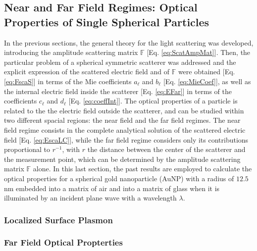 \documentclass[11pt]{Latex/Classes/PhDthesisPSnPDF}
\begin{document}
        \subsection{Near and Far Field Regimes: Optical Properties of Single Spherical Particles}
		 \label{ss:AuMie}

         In the previous sections, the general theory for the light scattering was developed, introducing the amplitude scattering matrix $\mathbb{F}$ [Eq. \eqref{eq:ScatAmpMat}]. Then, the particular problem of a spherical symmetric scatterer was addressed and the explicit expression of the scattered electric field and of $\mathbb{F}$ were obtained [Eq. \eqref{eq:FscaS}] in terms of the Mie coefficients $a_\ell$ and  $b_\ell$ [Eq. \eqref{eq:MieCoef}], as well as the internal electric field inside the scatterer [Eq. \eqref{eq:EFar}] in terms of the coefficients $c_\ell$ and $d_\ell$ [Eq. \eqref{eq:coeffInt}]. The  optical properties of a particle is related to the the electric field outside the scatterer,  and can be studied within two different spacial regions: the near field and the far field regimes. The near field regime consists in the complete analytical solution of the scattered electric field [Eq. \eqref{eq:EscaLC}], while the far field regime considers only its contributions proportional to $r^{-1}$, with $r$ the distance between the center of the scatterer and the measurement point, which can be determined by the amplitude scattering matrix $\mathbb{F}$ alone.  In this last section,
                the past results are employed to calculate the optical properties for a spherical gold nanoparticle (AuNP) with a radius of $12.5$ nm embedded into a matrix of air and into a matrix of glass when it is illuminated by an incident plane wave with a wavelength $\lambda$.

            \subsubsection{Localized Surface Plasmon}
             \label{sss:LSPR}
             

            \subsubsection{Far Field Optical Propterties}
             \label{sss:FarField}
             

\end{document}
